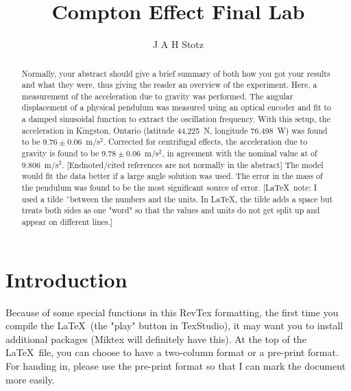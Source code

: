 \documentclass[prb,preprint,groupaddress,showpacs,superbib,floats]{revtex4-1}
\begin{document}


\title{Compton Effect Final Lab}
\author{J A H Stotz}

\begin{abstract}


Normally, your abstract should give a brief summary of both how you got your results and what they were, thus giving the reader an overview of the experiment.  Here, a measurement of the acceleration due to gravity was performed.  The angular displacement of a physical pendulum was measured using an optical encoder and fit to a damped sinusoidal function to extract the oscillation frequency.  With this setup, the acceleration in Kingston, Ontario (latitude 44.225~N, longitude 76.498~W) was found to be $9.76 \pm 0.06$~m/s$^2$.  Corrected for centrifugal effects, the acceleration due to gravity is found to be $9.78 \pm 0.06$~m/s$^2$, in agreement with the nominal value at of 9.806~m/s$^2$. [Endnoted/cited references are not normally in the abstract]  The model would fit the data better if a large angle solution was used. The error in the mass of the pendulum was found to be the most significant source of error. [\LaTeX\ note: I used a tilde \~\ between the numbers and the units.  In \LaTeX, the tilde adds a space but treats both sides as one "word" so that the values and units do not get split up and appear on different lines.]

\end{abstract}

\maketitle

\section{Introduction}\label{introduction}

Because of some special functions in this RevTex formatting, the first time you compile the \LaTeX \ (the "play" button in TexStudio), it may want you to install additional packages (Miktex will definitely have this).  At the top of the \LaTeX \ file, you can choose to have a two-column format or a pre-print format.  For handing in, please use the pre-print format so that I can mark the document more easily.
\end{document}
